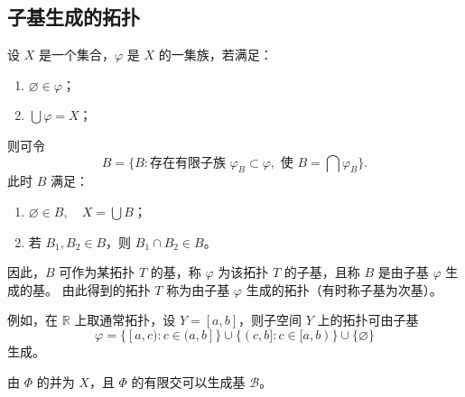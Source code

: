 \subsection{子基生成的拓扑}
\begin{definition}[子基]
设 $X$ 是一个集合，$\varphi$ 是 $X$ 的一集族，若满足：
\begin{enumerate}[(1)]
  \item $\varnothing \in \varphi$；
  \item $\displaystyle \bigcup \varphi = X$；
\end{enumerate}
则可令
\[
B = \{ B : \text{存在有限子族 } \varphi_B \subset \varphi, \text{ 使 } B = \bigcap \varphi_B \}.
\]
此时 $B$ 满足：
\begin{enumerate}[(1)]
  \item $\varnothing \in B,\quad X = \bigcup B$；
  \item 若 $B_1,B_2 \in B$，则 $B_1 \cap B_2 \in B$。
\end{enumerate}

因此，$B$ 可作为某拓扑 $T$ 的基，称 $\varphi$ 为该拓扑 $T$ 的子基，且称 $B$ 是由子基 $\varphi$ 生成的基。  
由此得到的拓扑 $T$ 称为由子基 $\varphi$ 生成的拓扑（有时称子基为次基）。
\end{definition}

\begin{example}
例如，在 $\mathbb{R}$ 上取通常拓扑，设 $Y = [a,b]$，则子空间 $Y$ 上的拓扑可由子基
\[
\varphi = \{[a,c): c \in (a,b]\} \cup \{(c,b]: c \in [a,b)\} \cup \{\varnothing\}
\]
生成。
\end{example}
由 \(\Phi\) 的并为 \(X\)，且 \(\Phi\) 的有限交可以生成基 \(\mathcal{B}\)。
\newpage
